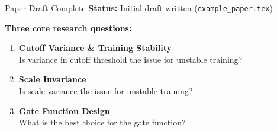 \documentclass{beamer}
\begin{document}
\begin{frame}{Paper Draft Complete}
\textbf{Status:} Initial draft written (\texttt{example\_paper.tex})

\vspace{0.5cm}
\textbf{Three core research questions:}

\vspace{0.3cm}
\begin{enumerate}
    \item \textbf{Cutoff Variance \& Training Stability}\\
    Is variance in cutoff threshold the issue for unstable training?

    \vspace{0.3cm}
    \item \textbf{Scale Invariance}\\
    Is scale variance the issue for unstable training?

    \vspace{0.3cm}
    \item \textbf{Gate Function Design}\\
    What is the best choice for the gate function?
\end{enumerate}
\end{frame}
\end{document}
